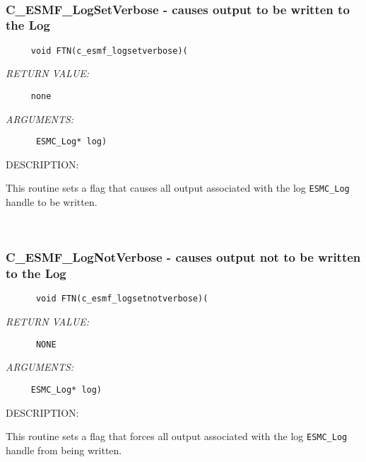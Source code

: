  
\mbox{}\hrulefill\ 
 
\subsubsection [C\_ESMF\_LogSetVerbose] {C\_ESMF\_LogSetVerbose - causes output to be written to the Log}


  
\begin{verbatim}     void FTN(c_esmf_logsetverbose)(\end{verbatim}{\em RETURN VALUE:}
\begin{verbatim}     none\end{verbatim}{\em ARGUMENTS:}
\begin{verbatim}      ESMC_Log* log)\end{verbatim}
{\sf DESCRIPTION:\\ }


      This routine sets a flag that causes all output associated with
      the log {\tt ESMC\_Log} handle to be written. 
 
\mbox{}\hrulefill\ 
 
\subsubsection [C\_ESMF\_LogNotVerbose] {C\_ESMF\_LogNotVerbose - causes output not to be written to the Log}


                         
\begin{verbatim}      void FTN(c_esmf_logsetnotverbose)(\end{verbatim}{\em RETURN VALUE:}
\begin{verbatim}      NONE\end{verbatim}{\em ARGUMENTS:}
\begin{verbatim}     ESMC_Log* log) \end{verbatim}
{\sf DESCRIPTION:\\ }


      This routine sets a flag that forces all output associated with
      the log {\tt ESMC\_Log} handle from being written. 
 
\mbox{}\hrulefill\ 
 

